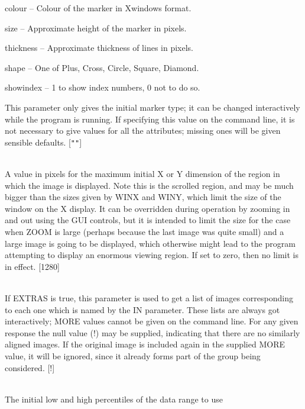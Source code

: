 \documentclass[twoside,11pt]{article}
\renewcommand{\_}{\texttt{\symbol{95}}}
\newcommand{\sstsubsection}[1]{ \item[{#1}] \mbox{} \\}
\newcommand{\sstitem}{\item}
\newcommand{\sstsubsection}[1]{\item[{#1}]}
\newcommand{\sstitem}{\item}
\begin{document}
{{{{            \sstitem
               colour     -- Colour of the marker in Xwindows format.

            \sstitem
               size       -- Approximate height of the marker in pixels.

            \sstitem
               thickness  -- Approximate thickness of lines in pixels.

            \sstitem
               shape      -- One of Plus, Cross, Circle, Square, Diamond.

            \sstitem
               showindex  -- 1 to show index numbers, 0 not to do so.

         }
         This parameter only gives the initial marker type; it can be
         changed interactively while the program is running.
         If specifying this value on the command line, it is not
         necessary to give values for all the attributes; missing ones
         will be given sensible defaults.
         [{\tt "}{\tt "}]
      }
      \sstsubsection{
         MAXCANV = INTEGER (Read and Write)
      }{
         A value in pixels for the maximum initial X or Y dimension of
         the region in which the image is displayed.  Note this is the
         scrolled region, and may be much bigger than the sizes given
         by WINX and WINY, which limit the size of the window on the
         X display.  It can be overridden during operation by zooming
         in and out using the GUI controls, but it is intended to
         limit the size for the case when ZOOM is large (perhaps
         because the last image was quite small) and a large image
         is going to be displayed, which otherwise might lead to
         the program attempting to display an enormous viewing region.
         If set to zero, then no limit is in effect.
         [1280]
      }
      \sstsubsection{
         MORE = LITERAL (Read)
      }{
         If EXTRAS is true, this parameter is used to get a list of
         images corresponding to each one which is named by the IN
         parameter.  These lists are always got interactively; MORE
         values cannot be given on the command line.  For any given
         response the null value (!) may be supplied, indicating that
         there are no similarly aligned images.  If the original image
         is included again in the supplied MORE value, it will be
         ignored, since it already forms part of the group being
         considered.
         [!]
      }
      \sstsubsection{
         PERCENTILES( 2 ) = \_DOUBLE (Read)
      }{
         The initial low and high percentiles of the data range to use
}}}
\end{document}
